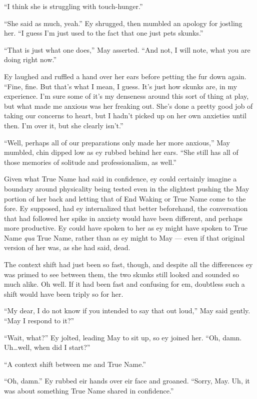 ``I think she is struggling with touch-hunger.''

``She said as much, yeah.'' Ey shrugged, then mumbled an apology for jostling her. ``I guess I'm just used to the fact that one just pets skunks.''

``That is just what one does,'' May asserted. ``And not, I will note, what you are doing right now.''

Ey laughed and ruffled a hand over her ears before petting the fur down again. ``Fine, fine. But that's what I mean, I guess. It's just how skunks are, in my experience. I'm sure some of it's my denseness around this sort of thing at play, but what made me anxious was her freaking out. She's done a pretty good job of taking our concerns to heart, but I hadn't picked up on her own anxieties until then. I'm over it, but she clearly isn't.''

``Well, perhaps all of our preparations only made her more anxious,'' May mumbled, chin dipped low as ey rubbed behind her ears. ``She still has all of those memories of solitude and professionalism, as well.''

Given what True Name had said in confidence, ey could certainly imagine a boundary around physicality being tested even in the slightest pushing the May portion of her back and letting that of End Waking or True Name come to the fore. Ey supposed, had ey internalized that better beforehand, the conversation that had followed her spike in anxiety would have been different, and perhaps more productive. Ey could have spoken to her as ey might have spoken to True Name \emph{qua} True Name, rather than as ey might to May — even if that original version of her was, as she had said, dead.

The context shift had just been so fast, though, and despite all the differences ey was primed to see between them, the two skunks still looked and sounded so much alike. Oh well. If it had been fast and confusing for em, doubtless such a shift would have been triply so for her.

``My dear, I do not know if you intended to say that out loud,'' May said gently. ``May I respond to it?''

``Wait, what?'' Ey jolted, leading May to sit up, so ey joined her. ``Oh, damn. Uh\ldots well, when did I start?''

``A context shift between me and True Name.''

``Oh, damn.'' Ey rubbed eir hands over eir face and groaned. ``Sorry, May. Uh, it was about something True Name shared in confidence.''

